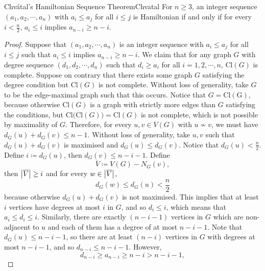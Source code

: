 \documentclass[math, code]{amznotes}
\theoremstyle{remark}
\begin{document}
\begin{thmbox}{Chv\'{a}tal's Hamiltonian Sequence Theorem}{Chvatal}
    For $n \geq 3$, an integer sequence $(a_1, a_2, \cdots, a_n)$ with $a_i \leq a_j$ for all $i \leq j$ is Hamiltonian if and only if for every $i < \frac{n}{2}$, $a_i \leq i$ implies $a_{n - i} \geq n - i$.
    \tcblower
    \begin{proof}
        Suppose that $(a_1, a_2, \cdots, a_n)$ is an integer sequence with $a_i \leq a_j$ for all $i \leq j$ such that $a_i \leq i$ implies $a_{n - i} \geq n - i$. We claim that for any graph $G$ with degree sequence $\left(d_1, d_2, \cdots, d_n\right)$ such that $d_i \geq a_i$ for all $i = 1, 2, \cdots, n$, $\mathrm{Cl}(G)$ is complete. Suppose on contrary that there exists some graph $G$ satisfying the degree condition but $\mathrm{Cl}(G)$ is not complete. Without loss of generality, take $G$ to be the edge-maximal graph such that this occurs. Notice that $G = \mathrm{Cl(G)}$, because otherwise $\mathrm{Cl}(G)$ is a graph with strictly more edges than $G$ satisfying the conditions, but $\mathrm{Cl}\bigl(\mathrm{Cl}(G)\bigr) = \mathrm{Cl}(G)$ is not complete, which is not possible by maximality of $G$. Therefore, for every $u, v \in V(G)$ with $u \not\sim v$, we must have $d_G(u) + d_G(v) \leq n - 1$. Without loss of generality, take $u, v$ such that $d_G(u) + d_G(v)$ is maximised and $d_G(u) \leq d_G(v)$. Notice that $d_G(u) < \frac{n}{2}$. Define $i \coloneqq d_G(u)$, then $d_G(v) \leq n - i - 1$. Define 
        \begin{equation*}
            \overline{V} \coloneqq V(G) - N_G(v),
        \end{equation*}
        then ${\left\lvert {\overline{V}} \right\rvert} \geq i$ and for every $w \in {\left\lvert {\overline{V}} \right\rvert}$, 
        \begin{equation*}
            d_G(w) \leq d_G(u) < \frac{n}{2}
        \end{equation*}
        because otherwise $d_G(u) + d_G(v)$ is not maximised. This implies that at least $i$ vertices have degrees at most $i$ in $G$, and so $d_i \leq i$, which means that $a_i \leq d_i \leq i$. Similarly, there are exactly $(n - i - 1)$ vertices in $G$ which are non-adjacent to $u$ and each of them has a degree of at most $n - i - 1$. Note that $d_G(u) \leq n - i - 1$, so there are at least $(n - i)$ vertices in $G$ with degrees at most $n - i - 1$, and so $d_{n - i} \leq n - i - 1$. However, 
        \begin{equation*}
            d_{n - i} \geq a_{n - i} \geq n - i > n - i - 1,
        \end{equation*}

\end{proof}
\end{thmbox}
\end{document}

